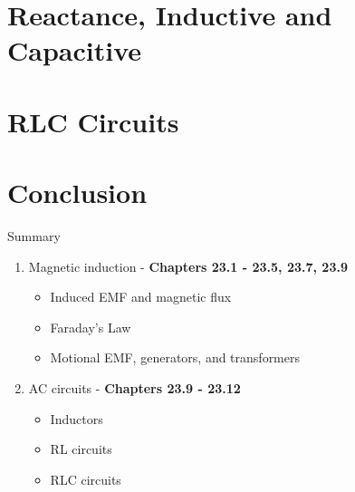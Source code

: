 \documentclass{beamer}
\begin{document}
\section{Reactance, Inductive and Capacitive}

\section{RLC Circuits}

\section{Conclusion}

\begin{frame}{Summary}
\begin{enumerate}
\item Magnetic induction - \textbf{Chapters 23.1 - 23.5, 23.7, 23.9}
\begin{itemize}
\item Induced EMF and magnetic flux
\item Faraday's Law
\item Motional EMF, generators, and transformers
\end{itemize}
\item AC circuits - \textbf{Chapters 23.9 - 23.12}
\begin{itemize}
\item Inductors
\item RL circuits
\item RLC circuits
\end{itemize}
\end{enumerate}
\end{frame}
\end{document}
